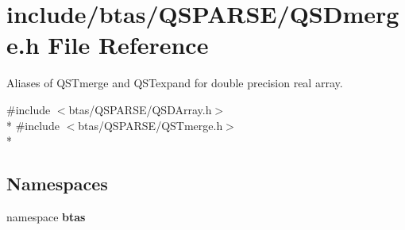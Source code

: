 \section{include/btas/\-Q\-S\-P\-A\-R\-S\-E/\-Q\-S\-Dmerge.h File Reference}
\label{d3/dcb/QSDmerge_8h}


Aliases of Q\-S\-Tmerge and Q\-S\-Texpand for double precision real array.  


{\ttfamily \#include $<$btas/\-Q\-S\-P\-A\-R\-S\-E/\-Q\-S\-D\-Array.\-h$>$}\\*
{\ttfamily \#include $<$btas/\-Q\-S\-P\-A\-R\-S\-E/\-Q\-S\-Tmerge.\-h$>$}\\*
\subsection*{Namespaces}
\begin{DoxyCompactItemize}
\item 
namespace {\bf btas}
\end{DoxyCompactItemize}

